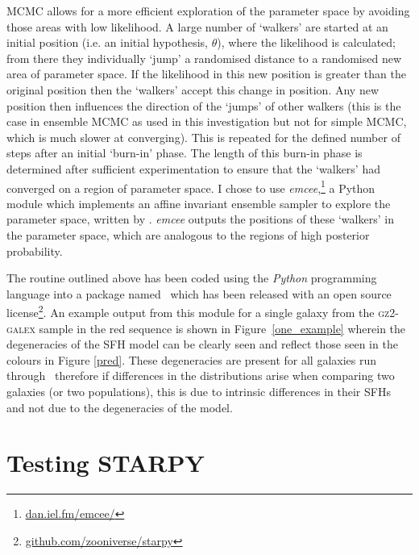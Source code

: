 MCMC allows for a more efficient exploration of the parameter space by avoiding those areas with low likelihood. A large number of `walkers' are started at an initial position (i.e. an initial hypothesis, $\theta$), where the likelihood is calculated; from there they individually `jump' a randomised distance to a randomised new area of parameter space. If the likelihood in this new position is greater than the original position then the `walkers' accept this change in position. Any new position then influences the direction of the  `jumps' of other walkers (this is the case in ensemble MCMC as used in this investigation but not for simple MCMC, which is much slower at converging). This is repeated for the defined number of steps after an initial `burn-in' phase. The length of this burn-in phase is determined after sufficient experimentation to ensure that the `walkers' had converged on a region of parameter space. I chose to use \emph{emcee},\footnote{\url{dan.iel.fm/emcee/}} a Python module which implements an affine invariant ensemble sampler to explore the parameter space, written by \cite{emcee13}. \emph{emcee} outputs the positions of these `walkers' in the parameter space, which are analogous to the regions of high posterior probability. 

The routine outlined above has been coded using the \emph{Python} programming language into a package named \starpy ~which has been released with an open source license\footnote{\url{github.com/zooniverse/starpy}}. An example output from this module for a single galaxy from the \textsc{gz2-galex} sample in the red sequence is shown in Figure~\ref{one_example} wherein the degeneracies of the SFH model can be clearly seen and reflect those seen in the colours in Figure \ref{pred}. These degeneracies are present for all galaxies run through \starpy\ therefore if differences in the distributions arise when comparing two galaxies (or two populations), this is due to intrinsic differences in their SFHs and not due to the degeneracies of the model. 

\section{Testing STARPY}

